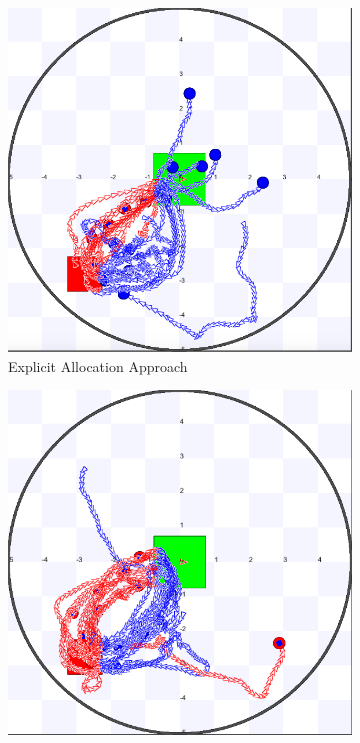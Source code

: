\documentclass[letterpaper, 10 pt, conference]{ieeeconf}  %
\begin{document}







\begin{figure}[h]
  \begin{subfigure}{.25\textwidth}
      \includegraphics[width=0.7\linewidth]{images/explicit/1/raw/16.png}
         \centering
         \caption{Explicit Allocation Approach}
   \end{subfigure}%
     \begin{subfigure}{.25\textwidth}
       \includegraphics[width=0.7\linewidth]{images/embodied/1/raw/16.png}

\end{subfigure}
\end{figure}
\end{document}
